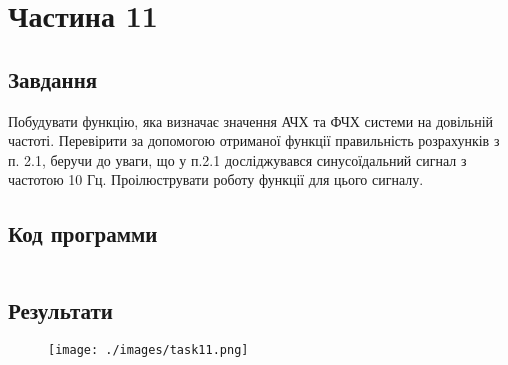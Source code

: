 \section{Частина 11}
\label{sec:task11}

\subsection{Завдання}
\label{subsec:task11_task}

Побудувати функцію, яка визначає значення АЧХ та ФЧХ системи
на довільній частоті. Перевірити за допомогою отриманої функції правильність
розрахунків з п. 2.1, беручи до уваги, що у п.2.1 досліджувався синусоїдальний
сигнал з частотою 10 Гц. Проілюструвати роботу функції для цього сигналу.

\subsection{Код программи}
\label{subsec:task11_code}
\inputminted{python}{../src/task11.py}

\subsection{Результати}
\label{subsec:task11_results}

\begin{figure}[!ht]
    \centering
    \texttt{[image: ./images/task11.png]}
\end{figure}
